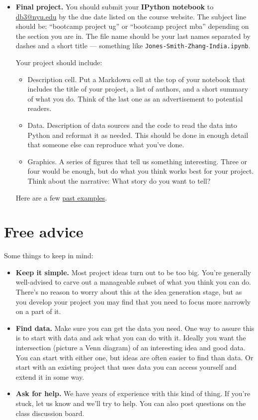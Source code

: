\documentclass[11pt]{article}
\begin{document}
\begin{itemize}
\item {\bf Final project.}
You should submit your {\bf IPython notebook\/} to \href{mailto:db3@nyu.edu}{db3@nyu.edu}
by the due date listed on the course website.
The subject line should be:  ``bootcamp project ug'' or ``bootcamp project mba''
depending on the section you are in.
The file name should be your last names separated by dashes and a short title ---
something like {\tt Jones-Smith-Zhang-India.ipynb}.

Your project should include:
\begin{itemize}
\item Description cell.  Put a Markdown cell at the top of your notebook that
   includes the title of your project, a list of authors, and a short summary
  of what you do.  Think of the last one as an advertisement to potential readers.
\item Data.  Description of data sources and the code to read the data into Python
and reformat it as needed.
This should be done in enough detail that someone else can reproduce what you've done.
\item Graphics.  A series of figures that tell us something interesting.
Three or four would be enough, but do what you think works best for your project.
Think about the narrative:  What story do you want to tell?
\end{itemize}
Here are a few \href{https://github.com/NYUDataBootcamp/Projects}
{past examples}.
\end{itemize}


\section*{Free advice}

Some things to keep in mind:
%
\begin{itemize}
\item {\bf Keep it simple.}
Most project ideas turn out to be too big.  You're generally well-advised
to carve out a manageable subset of what you think you can do.
There's no reason to worry about this at the idea generation stage,
but as you develop your project you may find that you need to focus
more narrowly on a part of it.

\item {\bf Find data.}  Make sure you can get the data you need.
One way to assure this is to start with data and ask what you can do with it.
Ideally you want the intersection (picture a Venn diagram) of an interesting
idea and good data.  You can start with either one, but ideas are often easier to
find than data.
Or start with an existing project that uses data you can access yourself
and extend it in some way.


\item {\bf Ask for help.}
We have years of experience with this kind of thing.
If you're stuck, let us know and we'll try to help.
You can also post questions on the class discussion board.

\end{itemize}
\end{document}
